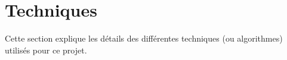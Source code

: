 \section{Techniques}

Cette section explique les détails des différentes techniques (ou algorithmes) utilisés
pour ce projet.

\newpage



\newpage



\newpage


